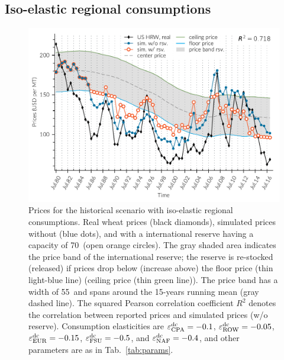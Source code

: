 
\subsection{Iso-elastic regional consumptions}
\begin{figure}[htbp]
  \centering
\includegraphics[width=.8\textwidth]{plots/full_var_demand/pric1980_2017}
\caption{Prices for the historical scenario with iso-elastic regional consumptions. Real wheat
  prices (black diamonds), simulated prices without (blue dots), and with a international reserve
  having a capacity of 70\mmt~(open orange circles). The gray shaded area indicates the price band
  of the international reserve; the reserve is re-stocked (released) if prices drop below (increase
  above) the floor price (thin light-blue line) (ceiling price (thin green line)). The price band
  has a width of 55\USD~and spans around the 15-years running mean (gray dashed line). The
  squared Pearson correlation coefficient $R^2$ denotes the correlation between reported prices and
  simulated prices (w/o reserve). Consumption elasticities are $\varepsilon^{\operatorname{dc}}_{\operatorname{CPA}}=-0.1$, $\varepsilon^{\operatorname{dc}}_{\operatorname{ROW}}=-0.05$, $\varepsilon^{\operatorname{dc}}_{\operatorname{EUR}}=-0.15$, $\varepsilon^{\operatorname{dc}}_{\operatorname{FSU}}=-0.5$, and $\varepsilon^{\operatorname{dc}}_{\operatorname{NAF}}=-0.4$, and other parameters are as in
  Tab.~\ref{tab:params}.}
    \label{fig:varDem_price}
\end{figure}
